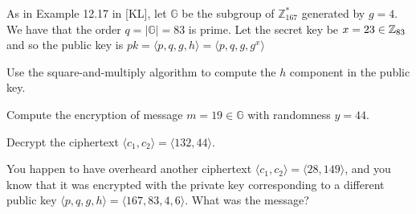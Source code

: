 \documentclass[a4paper,10pt,landscape,twocolumn]{scrartcl}
\begin{document}
\problems


\begin{exercise}
As in Example 12.17 in [KL], let $\mathbb{G}$ be the subgroup of $\mathbb{Z}_{167}^*$ generated by $g=4$. We have that the order $q=|\mathbb{G}|=83$ is prime. Let the secret key be $x=23 \in \mathbb{Z}_{83}$ and so the public key is $pk = \langle p,q,g,h \rangle = \langle p,q,g,g^x \rangle$ 
\begin{subex}
Use the square-and-multiply algorithm to compute the $h$ component in the public key.
\end{subex}
\begin{subex}
Compute the encryption of message $m=19 \in \mathbb{G}$ with randomness $y=44$.
\end{subex}
\begin{subex}
Decrypt the ciphertext $\langle c_1,c_2 \rangle = \langle 132,44 \rangle$.
\end{subex}
\begin{subex}
  You happen to have overheard another ciphertext $\langle c_1,c_2
  \rangle = \langle 28,149 \rangle$, and you know that it was
  encrypted with the private key corresponding to a different public key $\langle
  p,q,g,h \rangle = \langle 167,83,4,6 \rangle$. What was the message?
\end{subex}
\end{exercise}
\end{document}
